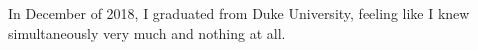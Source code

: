 
In December of 2018, I graduated from Duke University, feeling like I knew simultaneously very much and nothing at all.



\newpage


